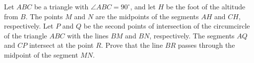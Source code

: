 Let $ABC$ be a triangle with $\angle ABC = 90^{\circ}$,  and let $H$ be the foot of the altitude from $B$. The points $M$ and $N$ are the midpoints of the segments $AH$ and $CH$,  respectively. Let $P$ and $Q$ be the second points of intersection of the circumcircle of the triangle $ABC$ with the lines $BM$ and $BN$,  respectively. The segments $AQ$ and $CP$ intersect at the point $R$. Prove that the line $BR$ passes through the midpoint of the segment $MN$.